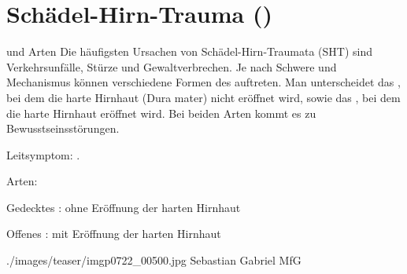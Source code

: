 


\clearpage %
\section{Schädel-Hirn-Trauma ()}
\label{topic:sht}%



\TextSlideTeaser
{\TxBeschreibung{} und Arten}%
{%
%
Die häufigsten Ursachen von Schädel-Hirn-Traumata (SHT) sind
Verkehrsunfälle, Stürze und Gewaltverbrechen. Je nach
Schwere und Mechanismus können verschiedene  Formen des 
auftreten. Man unterscheidet das , bei dem
die harte Hirnhaut (Dura mater) nicht eröffnet wird, sowie
das , bei dem die harte Hirnhaut eröffnet
wird. Bei beiden Arten kommt es zu Bewusstseinsstörungen.}%
{
\begin{compactitem}
  \item Leitsymptom: .
  \item Arten:
  \begin{compactitem}
    \item Gedecktes : ohne  Eröffnung der harten Hirnhaut
    \item Offenes : mit  Eröffnung der harten Hirnhaut
  \end{compactitem}
\end{compactitem}}%
{./images/teaser/imgp0722_00500.jpg}%
{}%
{}%
{Sebastian Gabriel}%
{MfG}%

\begin{Synopsis}
\end{Synopsis}

